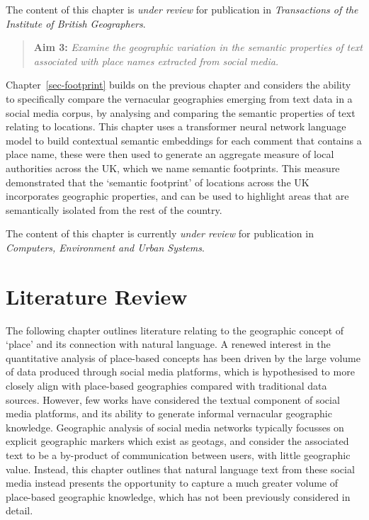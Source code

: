 \documentclass[
  letterpaper,
  11pt,
  english,
  onehalfspacing,
  headsepline]{MastersDoctoralThesis}
\begin{document}
The content of this chapter is \emph{under review} for publication in
\emph{Transactions of the Institute of British Geographers}.

\begin{quote}
\textbf{Aim 3:} \emph{Examine the geographic variation in the semantic
properties of text associated with place names extracted from social
media.}
\end{quote}

Chapter~\ref{sec-footprint} builds on the previous chapter and considers
the ability to specifically compare the vernacular geographies emerging
from text data in a social media corpus, by analysing and comparing the
semantic properties of text relating to locations. This chapter uses a
transformer neural network language model to build contextual semantic
embeddings for each comment that contains a place name, these were then
used to generate an aggregate measure of local authorities across the
UK, which we name semantic footprints. This measure demonstrated that
the `semantic footprint' of locations across the UK incorporates
geographic properties, and can be used to highlight areas that are
semantically isolated from the rest of the country.

The content of this chapter is currently \emph{under review} for
publication in \emph{Computers, Environment and Urban Systems}.


\hypertarget{sec-litreview}{%
\chapter{Literature Review}\label{sec-litreview}}

The following chapter outlines literature relating to the geographic
concept of `place' and its connection with natural language. A renewed
interest in the quantitative analysis of place-based concepts has been
driven by the large volume of data produced through social media
platforms, which is hypothesised to more closely align with place-based
geographies compared with traditional data sources. However, few works
have considered the textual component of social media platforms, and its
ability to generate informal vernacular geographic knowledge. Geographic
analysis of social media networks typically focusses on explicit
geographic markers which exist as geotags, and consider the associated
text to be a by-product of communication between users, with little
geographic value. Instead, this chapter outlines that natural language
text from these social media instead presents the opportunity to capture
a much greater volume of place-based geographic knowledge, which has not
been previously considered in detail.
\end{document}
